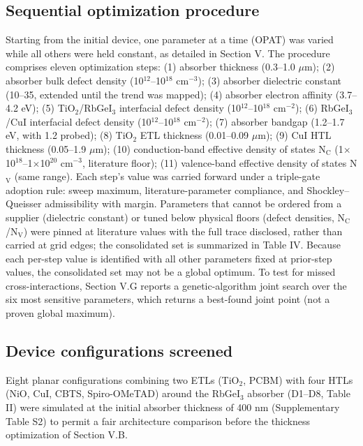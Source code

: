\documentclass[review]{elsarticle}
\begin{document}
\subsection{Sequential optimization procedure}
Starting from the initial device, one parameter at a time (OPAT) was varied while all others were held constant, as detailed in Section V.
The procedure comprises eleven optimization steps: (1) absorber thickness (0.3--1.0 $\mu$m); (2) absorber bulk defect density (10$^{12}$--10$^{18}$ cm$^{-3}$); (3) absorber dielectric constant (10--35, extended until the trend was mapped); (4) absorber electron affinity (3.7--4.2 eV); (5) TiO$_{2}$/RbGeI$_{3}$ interfacial defect density (10$^{12}$--10$^{18}$ cm$^{-2}$); (6) RbGeI$_{3}$/CuI interfacial defect density (10$^{12}$--10$^{18}$ cm$^{-2}$); (7) absorber bandgap (1.2--1.7 eV, with 1.2 probed); (8) TiO$_{2}$ ETL thickness (0.01--0.09 $\mu$m); (9) CuI HTL thickness (0.05--1.9 $\mu$m); (10) conduction-band effective density of states N$_{\mathrm{C}}$ (1$\times$10$^{18}$--1$\times$10$^{20}$ cm$^{-3}$, literature floor); (11) valence-band effective density of states N$_{\mathrm{V}}$ (same range). Each step's value was carried forward under a triple-gate adoption rule: sweep maximum, literature-parameter compliance, and Shockley--Queisser admissibility with margin. Parameters that cannot be ordered from a supplier (dielectric constant) or tuned below physical floors (defect densities, N$_{\mathrm{C}}$/N$_{\mathrm{V}}$) were pinned at literature values with the full trace disclosed, rather than carried at grid edges; the consolidated set is summarized in Table IV.
Because each per-step value is identified with all other parameters fixed at prior-step values, the consolidated set may not be a global optimum. To test for missed cross-interactions, Section V.G reports a genetic-algorithm joint search over the six most sensitive parameters, which returns a best-found joint point (not a proven global maximum).

\subsection{Device configurations screened}
Eight planar configurations combining two ETLs (TiO$_{2}$, PCBM) with four HTLs (NiO, CuI, CBTS, Spiro-OMeTAD) around the RbGeI$_{3}$ absorber (D1--D8, Table II) were simulated at the initial absorber thickness of 400 nm (Supplementary Table S2) to permit a fair architecture comparison before the thickness optimization of Section V.B.
\end{document}
